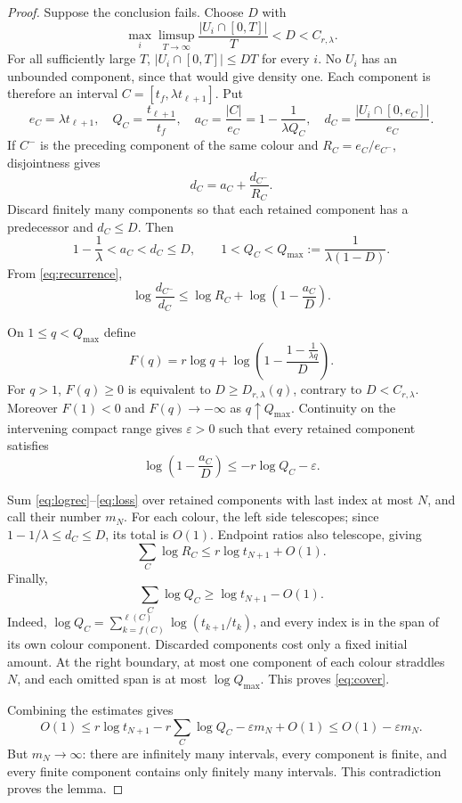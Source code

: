 \documentclass[11pt,a4paper]{article}
\theoremstyle{plain}
\theoremstyle{definition}
\theoremstyle{remark}
\begin{document}
\label{pf:geometric}
\lemgeometric*
\begin{proof}
Suppose the conclusion fails. Choose $D$ with
\[
 \max_i\limsup_{T\to\infty}\frac{|U_i\cap[0,T]|}{T}
 <D<C_{r,\lambda}.
\]
For all sufficiently large $T$,
$|U_i\cap[0,T]|\le DT$ for every $i$. No $U_i$ has an unbounded
component, since that would give density one. Each component is therefore
an interval $C=[t_f,\lambda t_{\ell+1}]$. Put
\[
 e_C=\lambda t_{\ell+1},\quad
 Q_C=\frac{t_{\ell+1}}{t_f},\quad
 a_C=\frac{|C|}{e_C}=1-\frac1{\lambda Q_C},\quad
 d_C=\frac{|U_i\cap[0,e_C]|}{e_C}.
\]
If $C^-$ is the preceding component of the same colour and
$R_C=e_C/e_{C^-}$, disjointness gives
\begin{equation}\label{eq:recurrence}
 d_C=a_C+\frac{d_{C^-}}{R_C}.
\end{equation}
Discard finitely many components so that each retained component has a
predecessor and $d_C\le D$. Then
\[
 1-\frac1\lambda<a_C<d_C\le D,\qquad
 1<Q_C<Q_{\max}:=\frac1{\lambda(1-D)}.
\]
From \eqref{eq:recurrence},
\begin{equation}\label{eq:logrec}
 \log\frac{d_{C^-}}{d_C}
 \le\log R_C+\log\left(1-\frac{a_C}{D}\right).
\end{equation}

On $1\le q<Q_{\max}$ define
\[
 F(q)=r\log q+
 \log\left(1-\frac{1-\frac1{\lambda q}}D\right).
\]
For $q>1$, $F(q)\ge0$ is equivalent to
$D\ge D_{r,\lambda}(q)$, contrary to $D<C_{r,\lambda}$.
Moreover $F(1)<0$ and $F(q)\to-\infty$ as $q\uparrow Q_{\max}$.
Continuity on the intervening compact range gives $\varepsilon>0$ such
that every retained component satisfies
\begin{equation}\label{eq:loss}
 \log\left(1-\frac{a_C}{D}\right)
 \le-r\log Q_C-\varepsilon.
\end{equation}

Sum \eqref{eq:logrec}--\eqref{eq:loss} over retained components with last
index at most $N$, and call their number $m_N$. For each colour, the
left side telescopes; since $1-1/\lambda\le d_C\le D$, its total is
$O(1)$. Endpoint ratios also telescope, giving
\[
 \sum_C\log R_C\le r\log t_{N+1}+O(1).
\]
Finally,
\begin{equation}\label{eq:cover}
 \sum_C\log Q_C\ge\log t_{N+1}-O(1).
\end{equation}
Indeed,
$\log Q_C=\sum_{k=f(C)}^{\ell(C)}\log(t_{k+1}/t_k)$, and every index is
in the span of its own colour component. Discarded components cost only
a fixed initial amount. At the right boundary, at most one component of
each colour straddles $N$, and each omitted span is at most
$\log Q_{\max}$. This proves \eqref{eq:cover}.

Combining the estimates gives
\[
 O(1)\le r\log t_{N+1}-r\sum_C\log Q_C
 -\varepsilon m_N+O(1)\le O(1)-\varepsilon m_N.
\]
But $m_N\to\infty$: there are infinitely many intervals, every component
is finite, and every finite component contains only finitely many
intervals. This contradiction proves the lemma.
\end{proof}
\end{document}
